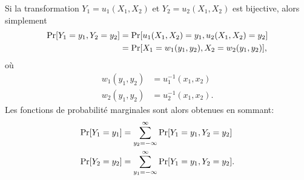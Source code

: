 Si la transformation $Y_1 = u_1(X_1, X_2)$ et $Y_2 = u_2(X_1, X_2)$
est bijective, alors simplement
\begin{align*}
  \operatorname{Pr} [ Y_1 = y_1, Y_2 = y_2 ]
  &= \operatorname{Pr} [ u_1(X_1, X_2) = y_1, u_2(X_1, X_2) = y_2 ] \\
  &= \operatorname{Pr} [ X_1 = w_1(y_1, y_2), X_2 = w_2(y_1, y_2) ],
\end{align*}
où
\begin{align*}
  w_1(y_1, y_2) &= u_1^{-1}(x_1, x_2) \\
  w_2(y_1, y_2) &= u_2^{-1}(x_1, x_2).
\end{align*}
Les fonctions de probabilité marginales sont alors obtenues en
sommant:
\begin{align*}
  \operatorname{Pr} [ Y_1 = y_1 ] &=
  \sum_{y_2 = -\infty}^\infty \operatorname{Pr} [ Y_1 = y_1, Y_2 = y_2 ] \\
  \operatorname{Pr} [ Y_2 = y_2 ] &=
  \sum_{y_1 = -\infty}^\infty \operatorname{Pr} [ Y_1 = y_1, Y_2 = y_2 ].
\end{align*}

